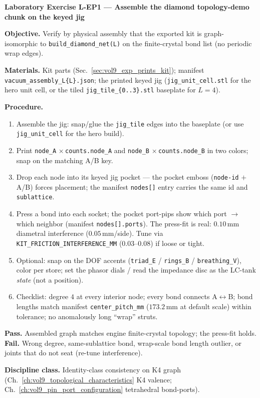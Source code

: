 \begin{exercisebox}
\textbf{Laboratory Exercise L-EP1 --- Assemble the diamond topology-demo chunk on the keyed jig}

\textbf{Objective.} Verify by physical assembly that the exported kit is graph-isomorphic to \texttt{build\_diamond\_net(L)} on the finite-crystal bond list (no periodic wrap edges).

\textbf{Materials.} Kit parts (Sec.~\ref{sec:vol9_exp_prints_kit}); manifest \texttt{vacuum\_assembly\_L\{L\}.json}; the printed keyed jig (\texttt{jig\_unit\_cell.stl} for the hero unit cell, or the tiled \texttt{jig\_tile\_\{0..3\}.stl} baseplate for $L=4$).

\textbf{Procedure.}
\begin{enumerate}
    \item Assemble the jig: snap/glue the \texttt{jig\_tile} edges into the baseplate (or use \texttt{jig\_unit\_cell} for the hero build).
    \item Print \texttt{node\_A} $\times$\,\texttt{counts.node\_A} and \texttt{node\_B} $\times$\,\texttt{counts.node\_B} in two colors; snap on the matching A/B key.
    \item Drop each node into its keyed jig pocket --- the pocket emboss (\texttt{node-id} $+$ A/B) forces placement; the manifest \texttt{nodes[]} entry carries the same id and \texttt{sublattice}.
    \item Press a bond into each socket; the pocket port-pips show which port $\to$ which neighbor (manifest \texttt{nodes[].ports}). The press-fit is real: $0.10\,\mathrm{mm}$ diametral interference ($0.05\,\mathrm{mm}$/side). Tune via \texttt{KIT\_FRICTION\_INTERFERENCE\_MM} ($0.03$--$0.08$) if loose or tight.
    \item Optional: snap on the DOF accents (\texttt{triad\_E} / \texttt{rings\_B} / \texttt{breathing\_V}), color per store; set the phasor dials / read the impedance disc as the LC-tank \emph{state} (not a position).
    \item Checklist: degree $4$ at every interior node; every bond connects A$\leftrightarrow$B; bond lengths match manifest \texttt{center\_pitch\_mm} ($173.2\,\mathrm{mm}$ at default scale) within tolerance; no anomalously long ``wrap'' struts.
\end{enumerate}

\textbf{Pass.} Assembled graph matches engine finite-crystal topology; the press-fit holds. \textbf{Fail.} Wrong degree, same-sublattice bond, wrap-scale bond length outlier, or joints that do not seat (re-tune interference).

\textbf{Discipline class.} Identity-class consistency on K4 graph (Ch.~\ref{ch:vol9_topological_characteristics} K4 valence; Ch.~\ref{ch:vol9_pin_port_configuration} tetrahedral bond-ports).
\end{exercisebox}

